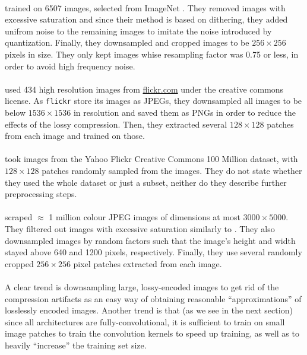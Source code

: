 \paragraph{\cite{balle2016end}} trained on 6507 images, selected from ImageNet
\cite{deng2009imagenet}. They removed images with excessive saturation and
since their method is based on dithering, they added unifrom noise to the
remaining images to imitate the noise introduced by quantization. Finally,
they downsampled and cropped images to be $256 \times 256$ pixels in size.
They only kept images whise resampling factor was 0.75 or less, in order to
avoid high frequency noise.

\paragraph{\cite{theis2017lossy}} used 434 high resolution images from \url{flickr.com}
under the creative commons license. As \texttt{flickr} store its images as
JPEGs, they downsampled all images to be below $1536 \times 1536$ in
resolution and saved them as PNGs in order to reduce the effects of the lossy
compression. Then, they extracted several $128 \times 128$ patches from each
image and trained on those.

\paragraph{\cite{rippel2017real}} took images from the Yahoo Flickr Creative Commons
100 Million dataset, with $128 \times 128$ patches randomly sampled from the
images. They do not state whether they used the whole dataset or just a
subset, neither do they describe further preprocessing steps.

\paragraph{\cite{balle2018variational}} scraped $\approx$ 1 million colour JPEG images
of dimensions at most $3000 \times 5000$. They filtered out images with
excessive saturation similarly to \cite{balle2016end}. They also
downsampled images by random factors such that the image's height and width
stayed above 640 and 1200 pixels, respectively. Finally, they use several
randomly cropped $256 \times 256$ pixel patches extracted from each image.

\paragraph{}
A clear trend is downsampling large, lossy-encoded images to get rid of the
compression artifacts as an easy way of obtaining reasonable ``approximations''
of losslessly encoded images. Another trend is that (as we see in the next
section) since all architectures are fully-convolutional, it is sufficient to
train on small image patches to train the convolution kernels to speed up
training, as well as to heavily ``increase'' the training set size.


